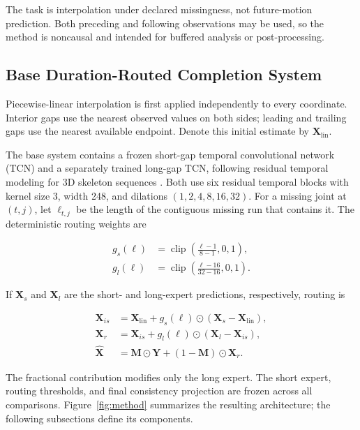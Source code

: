 \documentclass[fractalfract,article,submit,moreauthors,pdftex]{Definitions/mdpi}
\begin{document}
The task is interpolation under declared missingness, not future-motion prediction. Both preceding and following observations may be used, so the method is noncausal and intended for buffered analysis or post-processing.

\subsection{Base Duration-Routed Completion System}

Piecewise-linear interpolation is first applied independently to every coordinate. Interior gaps use the nearest observed values on both sides; leading and trailing gaps use the nearest available endpoint. Denote this initial estimate by $\mathbf{X}_{\mathrm{lin}}$.

The base system contains a frozen short-gap temporal convolutional network (TCN) and a separately trained long-gap TCN, following residual temporal modeling for 3D skeleton sequences \cite{kim2017tcn}. Both use six residual temporal blocks with kernel size 3, width 248, and dilations $(1,2,4,8,16,32)$. For a missing joint at $(t,j)$, let $\ell_{t,j}$ be the length of the contiguous missing run that contains it. The deterministic routing weights are

\begin{linenomath}
\begin{align}
g_s(\ell)&=\operatorname{clip}\left(\frac{\ell-1}{8-1},0,1\right),\\
g_l(\ell)&=\operatorname{clip}\left(\frac{\ell-16}{32-16},0,1\right).
\label{eq:router_weights}
\end{align}
\end{linenomath}

If $\mathbf{X}_s$ and $\mathbf{X}_l$ are the short- and long-expert predictions, respectively, routing is

\begin{linenomath}
\begin{align}
\mathbf{X}_{is}&=\mathbf{X}_{\mathrm{lin}}+g_s(\ell)\odot(\mathbf{X}_s-\mathbf{X}_{\mathrm{lin}}),\\
\mathbf{X}_{r}&=\mathbf{X}_{is}+g_l(\ell)\odot(\mathbf{X}_l-\mathbf{X}_{is}),\\
\widehat{\mathbf{X}}&=\mathbf{M}\odot\mathbf{Y}+(1-\mathbf{M})\odot\mathbf{X}_{r}.
\label{eq:router_output}
\end{align}
\end{linenomath}

The fractional contribution modifies only the long expert. The short expert, routing thresholds, and final consistency projection are frozen across all comparisons. Figure~\ref{fig:method} summarizes the resulting architecture; the following subsections define its components.
\end{document}
